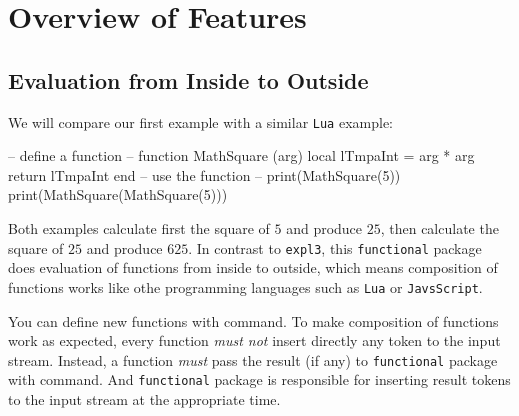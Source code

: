 \documentclass[oneside]{book}
\begin{document}
\chapter{Overview of Features}

\section{Evaluation from Inside to Outside}

We will compare our first example with a similar \verb!Lua! example:

\begin{minipage}{0.55\textwidth}
\begin{codehigh}
\IgnoreSpacesOn
\PrgNewFunction {} {
  \IntSet {}
  \Return { \Value \lTmpaInt }
}
\IgnoreSpacesOff
{}
\end{codehigh}
\end{minipage}%
\begin{minipage}{0.45\textwidth}
\begin{code}
-- define a function --
function MathSquare (arg)
  local lTmpaInt = arg * arg
  return lTmpaInt
end
-- use the function --
print(MathSquare(5))
print(MathSquare(MathSquare(5)))
\end{code}
\end{minipage}



Both examples calculate first the square of $5$ and produce $25$,
then calculate the square of $25$ and produce $625$.
In contrast to \verb!expl3!, this \verb!functional! package
does evaluation of functions from inside to outside,
which means composition of functions works like othe programming languages
such as \verb!Lua! or \verb!JavsScript!.

You can define new functions with  command.
To make composition of functions work as expected,
every function \emph{must not} insert directly any token to the input stream.
Instead, a function \emph{must} pass the result (if any) to \verb!functional! package
with  command. And \verb!functional! package is responsible for
inserting result tokens to the input stream at the appropriate time.
\end{document}
